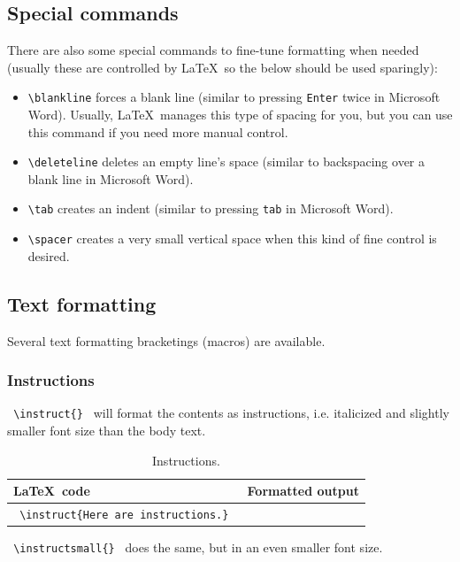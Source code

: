 \documentclass{article}
\begin{document}
\subsection{Special commands}

There are also some special commands to fine-tune formatting when needed (usually these are controlled by \LaTeX\, so the below should be used sparingly):

\begin{itemize}
	\item \lstinline{\blankline} forces a blank line (similar to pressing \lstinline{Enter} twice in Microsoft Word). Usually, \LaTeX\ manages this type of spacing for you, but you can use this command if you need more manual control.
	\item \lstinline{\deleteline} deletes an empty line's space (similar to backspacing over a blank line in Microsoft Word).
	\item \lstinline{\tab} creates an indent (similar to pressing \lstinline{tab} in Microsoft Word).
	\item \lstinline{\spacer} creates a very small vertical space when this kind of fine control is desired.
\end{itemize}

\subsection{Text formatting}

Several text formatting bracketings (macros) are available.

\subsubsection{Instructions}

\lstinline! \instruct{} ! will format the contents as instructions, i.e. italicized and slightly smaller font size than the body text.

\begin{table}[h!]
	\centering
	\begin{tabular}{l l} 
	\toprule
	\LaTeX\ code & Formatted output \\
	\midrule
	\lstinline! \instruct{Here are instructions.} ! & \sabon{\instruct{Here are instructions.}} \\
	\bottomrule
	\end{tabular}
	\caption{Instructions.}
\end{table}

\lstinline! \instructsmall{} ! does the same, but in an even smaller font size.
\end{document}
